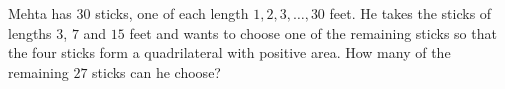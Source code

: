 Mehta has $30$ sticks, one of each length $1,2,3,\ldots,30$ feet. He takes the sticks of lengths $3$, $7$ and $15$ feet and wants to choose one of the remaining sticks so that the four sticks form a quadrilateral with positive area. How many of the remaining $27$ sticks can he choose?
